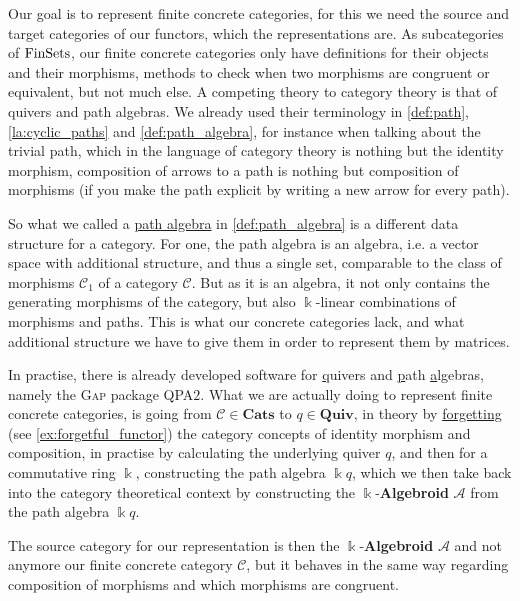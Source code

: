 
Our goal is to represent finite concrete categories, for this we need the source and target categories of our functors, which the
representations are.
As subcategories of $\textup{FinSets}$, our finite concrete categories only have definitions for their objects and their
morphisms, methods to check when two morphisms are congruent or equivalent, but not much else.
A competing theory to category theory is that of quivers and path algebras. We already used their terminology in
\ref{def:path}, \ref{la:cyclic_paths} and \ref{def:path_algebra}, for instance when talking about the trivial path,
which in the language of category theory is nothing but the identity morphism, composition of arrows to a path is nothing but
composition of morphisms (if you make the path explicit by writing a new arrow for every path).

So what we called a \ul{path algebra} in \ref{def:path_algebra} is a different data structure for a category. 
For one, the path algebra is an algebra, i.e. a vector space with additional structure, and thus a single set, comparable to the
class of morphisms $\mathcal{C}_{1}$ of a category $\mathcal{C}$.
But as it is an algebra, it not only contains the generating morphisms of the category, but also $\Bbbk$-linear combinations of
morphisms and paths. This is what our concrete categories lack, and what additional structure we have to give them in order
to represent them by matrices.

In practise, there is already developed software for \ul{q}uivers and \ul{p}ath \ul{a}lgebras, namely the \textsc{Gap} package
\textsc{QPA$2$}.
What we are actually doing to represent finite concrete categories, is going from $\mathcal{C} \in \mathbf{Cats}$ to $q \in \mathbf{Quiv}$,
in theory by \ul{forgetting} (see \ref{ex:forgetful_functor}) the category concepts of identity morphism and composition, in practise by calculating the
underlying quiver $q$, and then for a commutative ring $\Bbbk$, constructing the path algebra $\Bbbk q$, which we then
take back into the category theoretical context by constructing the $\Bbbk$-\textbf{Algebroid} $\mathcal{A}$ from the path algebra $\Bbbk q$.

The source category for our representation is then the $\Bbbk$-\textbf{Algebroid} $\mathcal{A}$ and not anymore our finite concrete
category $\mathcal{C}$, but it behaves in the same way regarding composition of morphisms and which morphisms are congruent.

